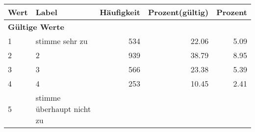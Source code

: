      \begin{longtable}{lXrrr}
     \toprule
     \textbf{Wert} & \textbf{Label} & \textbf{Häufigkeit} & \textbf{Prozent(gültig)} & \textbf{Prozent} \\
     \endhead
     \midrule
     \multicolumn{5}{l}{\textbf{Gültige Werte}}\\

     1 &
     \multicolumn{1}{X}{ stimme sehr zu   } &


       \num{534} &
       \num[round-mode=places,round-precision=2]{22,06} &
         \num[round-mode=places,round-precision=2]{5,09} \\

     2 &
     \multicolumn{1}{X}{ 2   } &


       \num{939} &
       \num[round-mode=places,round-precision=2]{38,79} &
         \num[round-mode=places,round-precision=2]{8,95} \\

     3 &
     \multicolumn{1}{X}{ 3   } &


       \num{566} &
       \num[round-mode=places,round-precision=2]{23,38} &
         \num[round-mode=places,round-precision=2]{5,39} \\

     4 &
     \multicolumn{1}{X}{ 4   } &


       \num{253} &
       \num[round-mode=places,round-precision=2]{10,45} &
         \num[round-mode=places,round-precision=2]{2,41} \\

     5 &
     \multicolumn{1}{X}{ stimme überhaupt nicht zu   } &



\end{longtable}
